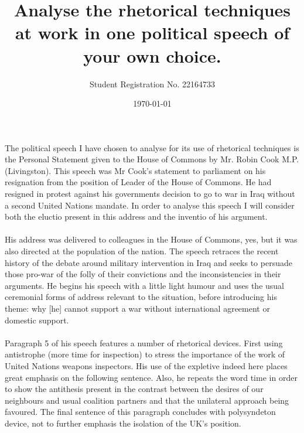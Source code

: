 \documentclass{article}
\title{Analyse the rhetorical techniques at work in one political speech of your own choice.}
\author{Student Registration No. 22164733}
\date{\today}
\begin{document}
\begin{onehalfspace}

\maketitle
\paragraph{}The political speech I have chosen to analyse for its use of rhetorical techniques is the Personal Statement given to the House of Commons by Mr. Robin Cook M.P. (Livingston). This speech was Mr Cook's statement to parliament on his resignation from the position of Leader of the House of Commons. He had resigned in protest against his governments decision to go to war in Iraq without a second United Nations mandate.  In order to analyse this speech I will consider both the eluctio present in this address  and the inventio of his argument. 

\paragraph{}His address was delivered to colleagues in the House of Commons, yes, but it was also directed at the population of the nation. The speech retraces the recent history of the debate around military intervention in Iraq and seeks to persuade those pro-war of the folly of their convictions and the inconsistencies in their arguments. He begins his speech with a little light humour and uses the usual ceremonial forms of address relevant to the situation, before introducing his theme: why [he] cannot support a war without international agreement or domestic support. 

\paragraph{}Paragraph 5 of his speech features a number of rhetorical devices. First using antistrophe (more time for inspection) to stress the importance of the work of United Nations weapons inspectors. His use of the expletive indeed here places great emphasis on the following sentence. Also, he repeats the word time in order to show the antithesis present in the contrast between the desires of our neighbours and usual coalition partners and that the unilateral approach being favoured. The final sentence of this paragraph concludes with polysyndeton device, not to further emphasis the isolation of the UK's position.


\end{onehalfspace}
\end{document}
